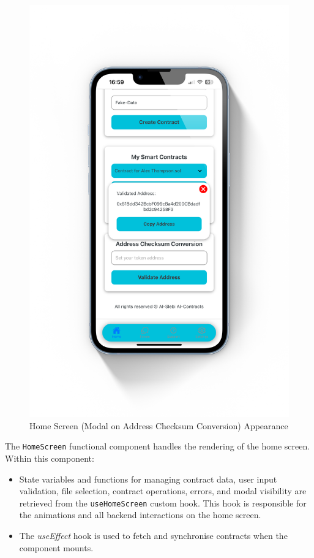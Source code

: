 \begin{figure}[!ht]
\begin{minipage}{0.49\textwidth}
        \includegraphics[scale=0.07]{LATEX/Appendices/Images/Software/Frontend/home_screen_4.png}
        \caption{Home Screen (Modal on Address Checksum Conversion) Appearance}
        \label{fig:home screen 4}
    \end{minipage}
\end{figure}

The \texttt{HomeScreen} functional component handles the rendering of the home screen. Within this component:

\begin{itemize}
    \item State variables and functions for managing contract data, user input validation, file selection, contract operations, errors, and modal visibility are retrieved from the \texttt{useHomeScreen} custom hook. This hook is responsible for the animations and all backend interactions on the home screen.
    \item The \textit{useEffect} hook is used to fetch and synchronise contracts when the component mounts.
\end{itemize}

